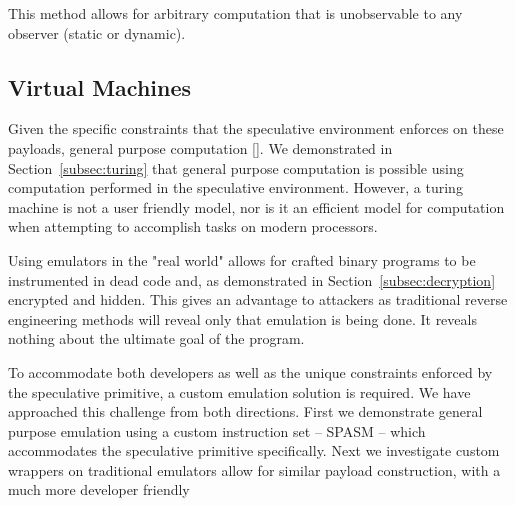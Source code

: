 This method allows for arbitrary computation that is unobservable to any observer (static or dynamic). 


% 
% 

\subsection{Virtual Machines}
Given the specific constraints that the speculative environment enforces on
these payloads, general purpose computation []. We demonstrated in
Section~\ref{subsec:turing} that general purpose computation is possible using
computation performed in the speculative environment. However, a turing machine
is not a user friendly model, nor is it an efficient model for computation when
attempting to accomplish tasks on modern processors. 

Using emulators in the "real world" allows for crafted binary programs to be
instrumented in dead code and, as demonstrated in
Section~\ref{subsec:decryption} encrypted and hidden. This gives an advantage to
attackers as traditional reverse engineering methods will reveal only that
emulation is being done. It reveals nothing about the ultimate goal of the
program. 

To accommodate both developers as well as the unique constraints 
enforced by the speculative primitive, a custom emulation solution is required. We 
have approached this challenge from both directions. First we demonstrate 
general purpose emulation using a custom instruction set -- SPASM -- which
accommodates the speculative primitive specifically. Next we investigate custom 
wrappers on traditional emulators allow for similar payload construction,
with a much more developer friendly 

%   


